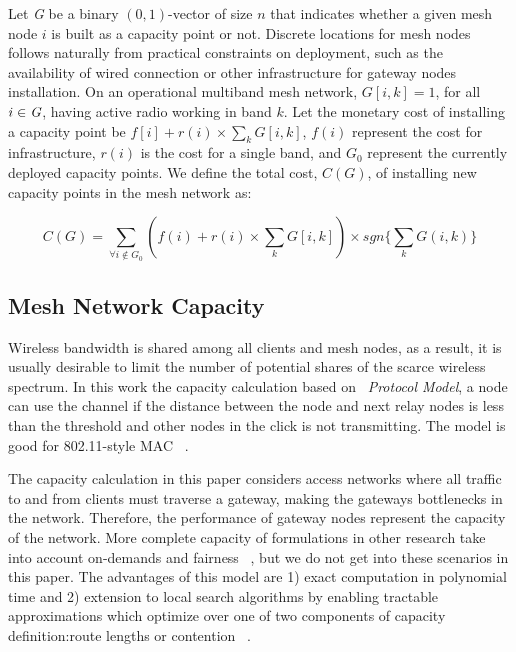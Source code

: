  
Let \emph{G} be a binary $(0,1)$-vector of size $n$ that indicates whether a given mesh node $i$ is built as a capacity point or not. 
Discrete locations for mesh nodes follows naturally from practical constraints on deployment, such as the availability of wired connection or other infrastructure for gateway nodes installation.
On an operational multiband mesh network, $G[i,k]=1$, for all $i\in \emph{G}$, having active radio working in band $k$. Let the monetary cost of installing a capacity point be $f[i]+r(i)\times \sum_kG[i,k]$, $f(i)$ represent the cost for infrastructure, $r(i)$ is the cost for a single band, and \emph{$G_0$} represent the currently deployed capacity points.
We define the total cost, $C(G)$, of installing new capacity points in the mesh network as:

\begin{equation}
\label{eq:cost}
C(G)=\sum_{\forall i\notin G_0} (f(i)+r(i)\times \sum_kG[i,k]) \times sgn\{\sum_kG(i,k)\}
\end{equation}





\subsection{Mesh Network Capacity}
\label{subsec:capacity}
Wireless bandwidth is shared among all clients and mesh nodes, as a result, it is usually desirable to limit the number of potential shares of the scarce wireless spectrum. 
In this work the capacity calculation based on ~\emph{Protocol Model}, a node can use the channel if the distance between the node and next relay nodes is less than the threshold and other nodes in the click is not transmitting. The model is good for 802.11-style MAC ~\cite{jain2005impact}.

The capacity calculation in this paper considers access networks where all traffic to and from clients must traverse a gateway, making the gateways bottlenecks in the network. 
Therefore, the performance of gateway nodes represent the capacity of the network. 
More complete capacity of formulations in other research take into account on-demands and fairness ~\cite{arkoulis2013optimal}, but we do not get into these scenarios in this paper.
The advantages of this model are 1) exact computation in polynomial time and 2) extension to local search algorithms by enabling tractable approximations which optimize over one of two components of capacity definition:route lengths or contention ~\cite{robinson2008adding}.

